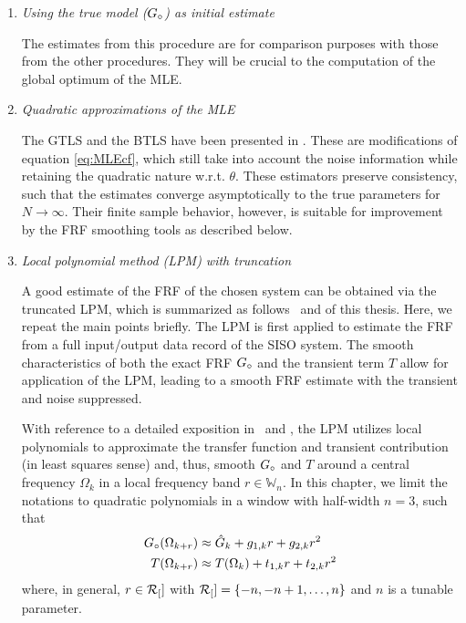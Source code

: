 \begin{enumerate}
\item \emph{Using the true model (${G}_{\circ}$) as initial estimate}

The estimates from this procedure are for comparison purposes with those from the other procedures. They will be crucial to the computation of the global optimum of the \gls{MLE}.

\item \emph{Quadratic approximations of the \gls{MLE}}

The \gls{GTLS} and the \gls{BTLS} have been presented in \citep{Pintelon1998}. 
These are modifications of equation \eqref{eq:MLEcf}, which still take into account the noise information while retaining the quadratic nature w.r.t. $\theta$. 
These estimators preserve consistency, such that the estimates converge asymptotically to the true parameters for $N\to\infty$. 
Their finite sample behavior, however, is suitable for improvement by the \gls{FRF} smoothing tools as described below.

\item \emph{Local polynomial method (LPM) with truncation}

A good estimate of the \gls{FRF} of the chosen system can be obtained via the truncated \gls{LPM}, which is summarized as follows~\citep{Lumori2014TIM} and  of this thesis.
Here, we repeat the main points briefly.
The \gls{LPM} is first applied to estimate the \gls{FRF} from a full input/output data record of the \gls{SISO} system.
The smooth characteristics of both the exact \gls{FRF} ${G}_{\circ}$ and the transient term $T$ allow for application of the \gls{LPM}, leading to a smooth \gls{FRF} estimate with the transient and noise suppressed.

  With reference to a detailed exposition in~\citep{Lumori2014TIM} and , the \gls{LPM} utilizes local polynomials to approximate the transfer function and transient contribution (in least squares sense) and, thus, smooth ${G}_{\circ}$ and $T$ around a central frequency $\Omega_{k}$ in a local frequency band $r\in\mathbb{W}_n$.
  In this chapter, we limit the notations to quadratic polynomials in a window with half-width $n=3$, such that
\begin{subequations}\label{lpmImplQuadG}
\begin{align}
{G}_{\circ}(\Omega_{k+r})&\approx \hat G_k + g_{1,k} r + g_{2,k}r^2
\\
T(\Omega_{k+r})&\approx T(\Omega_k)+t_{1,k}r + t_{2,k}r^2\label{lpmImplQuadT}
\end{align}
\end{subequations}
where, in general,$\ r\in \mathcal{R}_{[}]$ with $\mathcal{R}_{[}] = \{-n,-n+1,\dots,n\}$ and $n$ is a tunable parameter. 


\end{enumerate}
